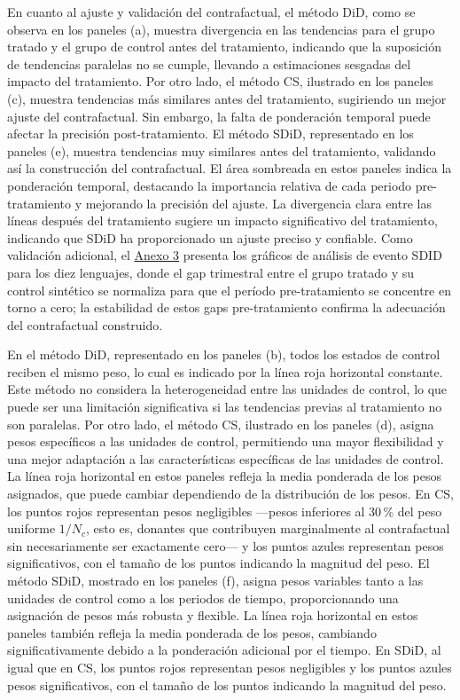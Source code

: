 \documentclass[12pt,a4paper]{article}
\begin{document}
En cuanto al ajuste y validación del contrafactual, el método DiD, como se observa en los paneles (a), muestra divergencia en las tendencias para el grupo tratado y el grupo de control antes del tratamiento, indicando que la suposición de tendencias paralelas no se cumple, llevando a estimaciones sesgadas del impacto del tratamiento. Por otro lado, el método CS, ilustrado en los paneles (c), muestra tendencias más similares antes del tratamiento, sugiriendo un mejor ajuste del contrafactual. Sin embargo, la falta de ponderación temporal puede afectar la precisión post-tratamiento. El método SDiD, representado en los paneles (e), muestra tendencias muy similares antes del tratamiento, validando así la construcción del contrafactual. El área sombreada en estos paneles indica la ponderación temporal, destacando la importancia relativa de cada periodo pre-tratamiento y mejorando la precisión del ajuste. La divergencia clara entre las líneas después del tratamiento sugiere un impacto significativo del tratamiento, indicando que SDiD ha proporcionado un ajuste preciso y confiable. Como validación adicional, el \hyperref[anexo:3]{Anexo 3} presenta los gráficos de análisis de evento SDID para los diez lenguajes, donde el gap trimestral entre el grupo tratado y su control sintético se normaliza para que el período pre-tratamiento se concentre en torno a cero; la estabilidad de estos gaps pre-tratamiento confirma la adecuación del contrafactual construido.

En el método DiD, representado en los paneles (b), todos los estados de control reciben el mismo peso, lo cual es indicado por la línea roja horizontal constante. Este método no considera la heterogeneidad entre las unidades de control, lo que puede ser una limitación significativa si las tendencias previas al tratamiento no son paralelas. Por otro lado, el método CS, ilustrado en los paneles (d), asigna pesos específicos a las unidades de control, permitiendo una mayor flexibilidad y una mejor adaptación a las características específicas de las unidades de control. La línea roja horizontal en estos paneles refleja la media ponderada de los pesos asignados, que puede cambiar dependiendo de la distribución de los pesos. En CS, los puntos rojos representan pesos negligibles —pesos inferiores al 30\,\% del peso uniforme $1/N_c$, esto es, donantes que contribuyen marginalmente al contrafactual sin necesariamente ser exactamente cero— y los puntos azules representan pesos significativos, con el tamaño de los puntos indicando la magnitud del peso. El método SDiD, mostrado en los paneles (f), asigna pesos variables tanto a las unidades de control como a los periodos de tiempo, proporcionando una asignación de pesos más robusta y flexible. La línea roja horizontal en estos paneles también refleja la media ponderada de los pesos, cambiando significativamente debido a la ponderación adicional por el tiempo. En SDiD, al igual que en CS, los puntos rojos representan pesos negligibles y los puntos azules pesos significativos, con el tamaño de los puntos indicando la magnitud del peso.
\end{document}
